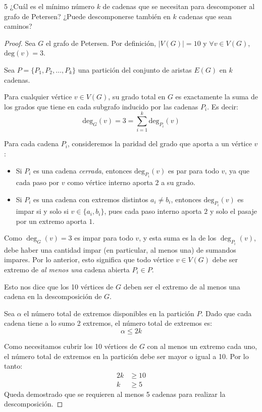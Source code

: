 \begin{ejercicioEntregar}{5}
    ¿Cuál es el mínimo número \( k \) de cadenas que se necesitan para descomponer al grafo de Petersen? ¿Puede descomponerse también en \( k \) cadenas que sean caminos?
\end{ejercicioEntregar}
\begin{proof}
    Sea \( G \) el grafo de Petersen. Por definición, \(|V(G)| = 10\) y \( \forall v \in V(G)\), \(\text{deg}(v) = 3\).

    Sea \( P = \{P_1, P_2, \dots, P_k\} \) una partición del conjunto de aristas \(E(G)\) en \(k\) cadenas.

    Para cualquier vértice \(v \in V(G)\), su grado total en \(G\) es exactamente la suma de los grados que tiene en cada subgrafo inducido por las cadenas \(P_i\). Es decir:
    \[
        \text{deg}_G(v) = 3 = \sum_{i=1}^k \text{deg}_{P_i}(v)
    \]

    Para cada cadena \(P_i\), consideremos la paridad del grado que aporta a un vértice \(v\):
    \begin{itemize}
        \item Si \(P_i\) es una cadena \emph{cerrada}, entonces \(\text{deg}_{P_i}(v)\) es par para todo \(v\), ya que cada paso por \(v\) como vértice interno aporta \(2\) a su grado.
        \item Si \(P_i\) es una cadena con extremos distintos \(a_i \ne b_i\), entonces \(\text{deg}_{P_i}(v)\) es impar si y solo si \( v \in \{a_i, b_i\} \), pues cada paso interno aporta \(2\) y solo el pasaje por un extremo aporta \(1\).
    \end{itemize}

    Como \(\deg_G(v) = 3\) es impar para todo \(v\), y esta suma es la de los \(\deg_{P_i}(v)\), debe haber una cantidad impar (en particular, al menos una) de sumandos impares. Por lo anterior, esto significa que todo vértice \(v \in V(G)\) debe ser extremo de \emph{al menos una} cadena abierta \(P_i \in P\).

    Esto nos dice que los 10 vértices de \(G\) deben ser el extremo de al menos una cadena en la descomposición de \(G\).

    Sea \( \alpha \) el número total de extremos disponibles en la partición \(P\). Dado que cada cadena tiene a lo sumo 2 extremos, el número total de extremos es:
    \[
        \alpha \le 2k
    \]

    Como necesitamos cubrir los 10 vértices de \(G\) con al menos un extremo cada uno, el número total de extremos en la partición debe ser mayor o igual a 10. Por lo tanto:
    \begin{align*}
        2k & \ge 10 \\
        k  & \ge 5
    \end{align*}
    Queda demostrado que se requieren al menos 5 cadenas para realizar la descomposición.


\end{proof}
